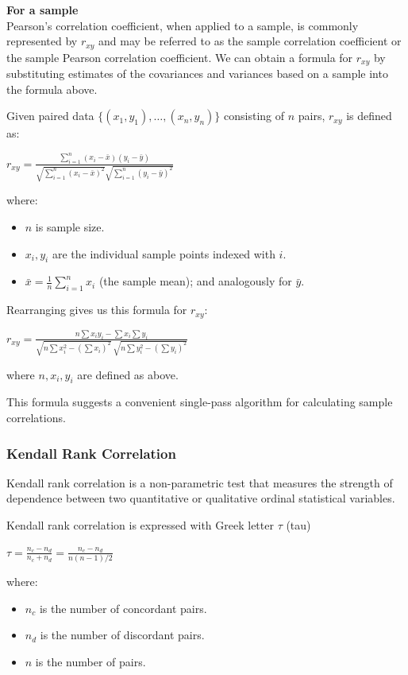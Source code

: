 \documentclass{article}
\begin{document}
\textbf{For a sample}\\
Pearson's correlation coefficient, when applied to a sample, is commonly represented by $r_{xy}$ and may be referred to as the sample correlation coefficient or the sample Pearson correlation coefficient. 
We can obtain a formula for $r_{xy}$ by substituting estimates of the covariances and variances based on a sample into the formula above. 

Given paired data $\displaystyle \{(x_{1},y_{1}),\ldots ,(x_{n},y_{n})\}$ consisting of $n$ pairs, $r_{xy}$ is defined as:

$\displaystyle r_{xy}={\frac {\sum _{i=1}^{n}(x_{i}-{\bar {x}})(y_{i}-{\bar {y}})}{{\sqrt {\sum _{i=1}^{n}(x_{i}-{\bar {x}})^{2}}}{\sqrt {\sum _{i=1}^{n}(y_{i}-{\bar {y}})^{2}}}}}$

where:
\begin{itemize}
    \item $n$ is sample size.
    \item $x_{i},y_{i}$ are the individual sample points indexed with $i$.
    \item ${\textstyle {\bar {x}}={\frac {1}{n}}\sum _{i=1}^{n}x_{i}}$ (the sample mean); and analogously for $\bar {y}$.
\end{itemize}

Rearranging gives us this formula for $\displaystyle r_{xy}$:

${\displaystyle r_{xy}={\frac {n\sum x_{i}y_{i}-\sum x_{i}\sum y_{i}}{{\sqrt {n\sum x_{i}^{2}-\left(\sum x_{i}\right)^{2}}}~{\sqrt {n\sum y_{i}^{2}-\left(\sum y_{i}\right)^{2}}}}}}$

where $n,x_{i},y_{i}$ are defined as above.

This formula suggests a convenient single-pass algorithm for calculating sample correlations.

\subsubsection{Kendall Rank Correlation}
Kendall rank correlation is a non-parametric test that measures the strength of dependence between two quantitative or qualitative ordinal statistical variables. 

Kendall rank correlation is expressed with Greek letter $\tau$ (tau)

$\displaystyle \tau = \frac{n_c - n_d}{n_c + n_d} = \frac{n_c - n_d}{n(n - 1)/2}$

where:
\begin{itemize}
    \item $n_c$ is the number of concordant pairs.
    \item $n_d$ is the number of discordant pairs.
    \item $n$ is the number of pairs.
\end{itemize}
\end{document}
